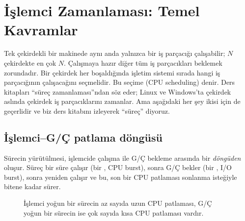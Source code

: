 \section{İşlemci Zamanlaması: Temel Kavramlar}

Tek çekirdekli bir makinede aynı anda yalnızca bir iş parçacığı çalışabilir; $N$ çekirdekte en çok $N$. Çalışmaya hazır diğer tüm iş parçacıkları beklemek zorundadır. Bir çekirdek her boşaldığında işletim sistemi sırada hangi iş parçacığının çalışacağını seçmelidir. Bu seçime  (CPU scheduling) denir. Ders kitapları ``süreç zamanlaması''ndan söz eder; Linux ve Windows'ta çekirdek aslında çekirdek iş parçacıklarını zamanlar. Ama aşağıdaki her şey ikisi için de geçerlidir ve biz ders kitabını izleyerek ``süreç'' diyoruz.

\subsection{İşlemci--G/Ç patlama döngüsü}

Sürecin yürütülmesi, işlemcide çalışma ile G/Ç bekleme arasında bir \emph{döngüden} oluşur. Süreç bir süre çalışır (bir , CPU burst), sonra G/Ç bekler (bir , I/O burst), sonra yeniden çalışır ve bu, son bir CPU patlaması sonlanma isteğiyle bitene kadar sürer.

\begin{figure}[H]
\centering
{}
\caption{İşlemci yoğun bir sürecin az sayıda uzun CPU patlaması, G/Ç yoğun bir sürecin ise çok sayıda kısa CPU patlaması vardır.}
\end{figure}

